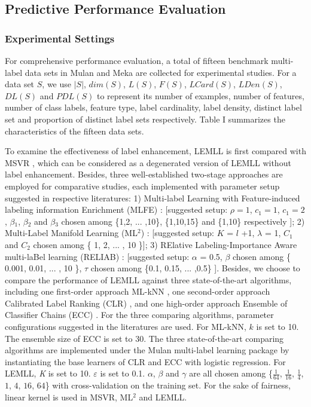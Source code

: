 \documentclass[conference]{IEEEtran}
\begin{document}
\subsection{Predictive Performance Evaluation}
\subsubsection{Experimental Settings}
For comprehensive performance evaluation, a total of fifteen benchmark multi-label data sets in Mulan \cite{tsoumakas2011mulan} and Meka \cite{MEKA} are collected for experimental studies. For a data set $S$, we use $|S|$, $dim(S)$, $L(S)$, $F(S)$, $LCard(S)$, $LDen(S)$, $DL(S)$ and $PDL(S)$ to represent its number of examples, number of features, number of class labels, feature type, label cardinality, label density, distinct label set and proportion of distinct label sets respectively. Table I summarizes the characteristics of the fifteen data sets.

To examine the effectiveness of label enhancement, LEMLL is first compared with MSVR \cite{tuia2011multioutput}, which can be considered as a degenerated version of LEMLL without label enhancement. Besides, three well-established two-stage approaches are employed for comparative studies, each implemented with parameter setup suggested in respective literatures: 1) Multi-label Learning with Feature-induced labeling information Enrichment (MLFE) \cite{zhang2018feature}: [suggested setup: $\rho=1$, $c_1=1$, $c_1=2$, $\beta$$_1$, $\beta$$_2$ and $\beta$$_3$ chosen among \{1,2, ... ,10\}, \{1,10,15\} and \{1,10\} respectively ]; 2) Multi-Label Manifold Learning (ML$^2$) \cite{hou2016multi}: [suggested setup: $K$ = $l$ +1, $\lambda$ = 1, $C_{1}$ and $C_{2}$ chosen among \{ 1, 2, ... , 10 \}]; 3) RElative Labeling-Importance Aware multi-laBel learning (RELIAB) \cite{li2015leveraging}: [suggested setup: $\alpha$ = 0.5, $\beta$ chosen among \{ 0.001, 0.01, ... , 10 \}, $\tau$ chosen among \{0.1, 0.15, ... ,0.5\} ]. Besides, we choose to compare the performance of LEMLL against three state-of-the-art algorithms, including one first-order approach ML-kNN \cite{zhang2007ml}, one second-order approach Calibrated Label Ranking (CLR) \cite{furnkranz2008multilabel}, and one high-order approach Ensemble of Classifier Chains (ECC) \cite{read2011classifier}. For the three comparing algorithms, parameter configurations suggested in the literatures are used. For ML-kNN, $k$ is set to 10. The ensemble size of ECC is set to 30. The three state-of-the-art comparing algorithms are implemented under the Mulan multi-label learning package \cite{tsoumakas2011mulan} by instantiating the base learners of CLR and ECC with logistic regression. For LEMLL, \emph{K} is set to 10. $\varepsilon$ is set to 0.1. $\alpha$, $\beta$ and $\gamma$ are all chosen among \{$\frac{1}{64}$, $\frac{1}{16}$, $\frac{1}{4}$, $1$, $4$, $16$, $64$\} with cross-validation on the training set. For the sake of fairness, linear kernel is used in MSVR, ML$^2$ and LEMLL.
\end{document}
